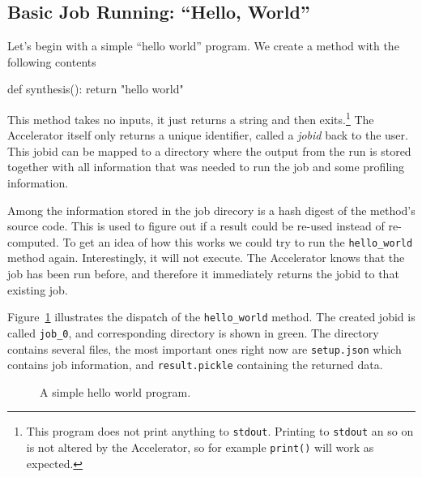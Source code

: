 \documentclass[a4paper]{article}
\begin{document}
\subsection{Basic Job Running:  ``Hello, World''}



Let's begin with a simple ``hello world'' program.  We create a method
with the following contents
\begin{python}
def synthesis():
    return "hello world"
\end{python}
This method takes no inputs, it just returns a string and then
exits.\footnote{This program does not print anything to
  \texttt{stdout}.  Printing to \texttt{stdout} an so on is not
  altered by the Accelerator, so for example \texttt{print()} will
  work as expected.}  The Accelerator itself only returns a unique
identifier, called a \textsl{jobid} back to the user.  This jobid can
be mapped to a directory where the output from the run is stored
together with all information that was needed to run the job and some
profiling information.

Among the information stored in the job direcory is a hash digest of
the method's source code.  This is used to figure out if a result
could be re-used instead of re-computed.  To get an idea of how this
works we could try to run the \texttt{hello\_world} method again.
Interestingly, it will not execute.  The Accelerator knows that the
job has been run before, and therefore it immediately returns the
jobid to that existing job.

Figure~\ref{fig:execflow-hello-world} illustrates the dispatch of the
\texttt{hello\_world} method.  The created jobid is called
\texttt{job\_0}, and corresponding directory is shown in green.  The
directory contains several files, the most important ones right now
are \texttt{setup.json} which contains job information, and
\texttt{result.pickle} containing the returned data.



\vfill
\begin{figure}[h!]
  \begin{center}
    
    \caption{A simple hello world program.}
    \label{fig:execflow-hello-world}
  \end{center}
\end{figure}

\clearpage
\end{document}
